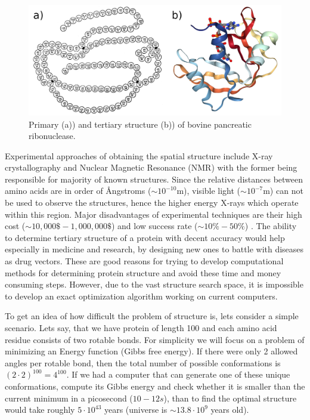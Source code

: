 \begin{figure}[b!]
    \centering
    \includegraphics[width=\linewidth]{imgs_tomas/primary_tertiary.png}
    \caption{Primary (a)) \cite{anfinsen} and tertiary structure (b)) \cite{pdb} of bovine pancreatic ribonuclease.}
    \label{fig:primarytertiary}
\end{figure}

Experimental approaches of obtaining the spatial structure include X-ray crystallography and Nuclear Magnetic Resonance (NMR) with the former being responsible for majority of known structures. 
Since the relative distances between amino acids are in order of \AA ngstroms ($\sim10^{-10}$m), visible light ($\sim10^{-7}$m) can not be used to observe the structures, hence the higher energy X-rays which operate within this region. 
Major disadvantages of experimental techniques are their high cost ($\sim 10,000\mathdollar-1,000,000\mathdollar$) and low success rate ($\sim 10\%-50\%$) \cite{protcost}.
The ability to determine tertiary structure of a protein with decent accuracy would help especially in medicine and research, by designing new ones to battle with diseases as drug vectors. %
These are good reasons for trying to develop computational methods for determining protein structure and avoid these time and money consuming steps.
However, due to the vast structure search space, it is impossible to develop an exact optimization algorithm working on current computers.

To get an idea of how difficult the problem of structure is, lets consider a simple scenario. 
Lets say, that we have protein of length 100 and each amino acid residue consists of two rotable bonds. For simplicity we will focus on a problem of minimizing an Energy function (Gibbs free energy).
If there were only 2 allowed angles per rotable bond, then the total number of possible conformations is $(2\cdot2)^{100} = 4^{100}$. 
If we had a computer that can generate one of these unique conformations, compute its Gibbs energy and check whether it is smaller than the current minimum in a picosecond ($10-{12} s$), than to find the optimal structure would take roughly $5 \cdot 10^{43}$ years (universe is $\sim 13.8\cdot10^9$ years old).

